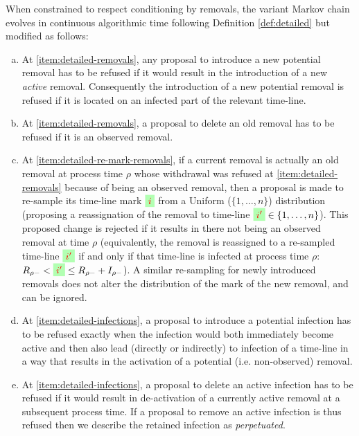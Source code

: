 \documentclass[]{article}
\newcommand{\target}{{\colorbox{green!30}{$\textcolor{red}{i}$}}}
\newcommand{\targetm}{{\colorbox{green!30}{$\textcolor{red}{i'}$}}}
\begin{document}
\begin{defn}
When constrained to respect conditioning by removals, the variant
\label{def:variant-evolution}
Markov chain evolves
in continuous algorithmic time following Definition \ref{def:detailed} but modified as follows:%
\begin{enumerate}[(a)]
 \item \label{item:refuse-new-removal}
At \ref{item:detailed-removals}, 
any proposal to introduce a new potential removal has to be refused 
if it would result in the introduction of a new \emph{active} removal.
Consequently the introduction of a new potential removal is refused 
if it is located on an infected part of the relevant time-line. 
\item \label{item:perpetuate-old-removal} 
At \ref{item:detailed-removals}, 
a proposal to delete an old removal has to be refused if it is an observed removal. 
\item  \label{item:re-sample-old-mark}
At \ref{item:detailed-re-mark-removals}, 
if a current removal is actually 
an old removal at  process time \(\rho\) whose withdrawal was refused at \ref{item:detailed-removals} because 
of being an observed removal,
then a proposal is made to re-sample its time-line mark
\(\target\) from a Uniform (\(\{1,\dots,n\}\)) distribution 
(proposing a reassignation of
the removal to time-line \(\targetm\in\{1,\dots,n\}\)).
This proposed change is rejected
if it results in there
not being an observed removal at time \(\rho\)
(equivalently, the removal is reassigned to 
a re-sampled time-line \(\targetm\) if and only if 
that time-line is infected at process time \(\rho\): \(R_{\rho-} < \targetm \leq R_{\rho-} + I_{\rho-}\)).
A similar re-sampling for newly introduced removals does not alter the distribution of the mark of
the new removal, and can be ignored.
\item  \label{item:refuse-new-infection}
At \ref{item:detailed-infections},
a proposal to introduce a potential infection 
has to be refused exactly when the infection would both immediately become active and then also
lead (directly or indirectly) to infection of a time-line in a way that results
in the activation of 
a potential (i.e. non-observed) removal.
\item  \label{item:perpetuate-old-infection}
At \ref{item:detailed-infections},
a proposal to delete an active infection has to be refused if it would result in 
de-activation of a currently active removal
at a subsequent process time.
If a proposal to remove an active infection is thus refused
then we describe
the retained infection as \emph{perpetuated}. 
\end{enumerate}
\end{defn}
\end{document}
